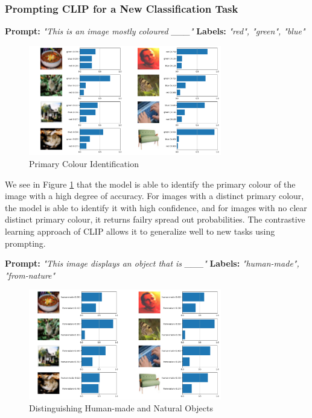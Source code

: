\documentclass[a4paper]{article}
\begin{document}
\subsubsection{Prompting CLIP for a New Classification Task}
\textbf{Prompt:} \textit{"This is an image mostly coloured \_\_\_"}\newline
\textbf{Labels:} \textit{"red", "green", "blue"}
\begin{figure}[h]
    \centering
    \includegraphics[width=0.75\textwidth]{"imgs/cifar100-test_red,green,blue.png"}
    \caption{Primary Colour Identification}
    \label{fig:CLIP-primary-colour}
\end{figure}

We see in Figure \ref{fig:CLIP-primary-colour} that the model is able to identify the primary colour of the image
with a high degree of accuracy. For images with a distinct primary colour, the model is able to identify it with
high confidence, and for images with no clear distinct primary colour, it returns failry spread out probabilities.
The contrastive learning approach of CLIP allows it to generalize well to new tasks using prompting.
\bigskip

\textbf{Prompt:} \textit{"This image displays an object that is \_\_\_"}\newline
\textbf{Labels:} \textit{"human-made", "from-nature"}
\begin{figure}[h]
    \centering
    \includegraphics[width=0.75\textwidth]{"imgs/cifar100-test_human-made,from-nature.png"}
    \caption{Distinguishing Human-made and Natural Objects}
    \label{fig:CLIP-human-vs-nature}
\end{figure}
\end{document}
